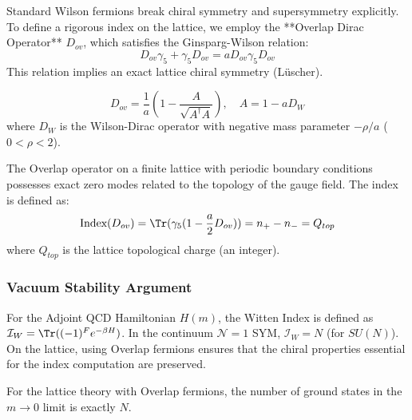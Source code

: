 Standard Wilson fermions break chiral symmetry and supersymmetry explicitly. To define a rigorous index on the lattice, we employ the **Overlap Dirac Operator** $D_{ov}$, which satisfies the Ginsparg-Wilson relation:
\begin{equation}
D_{ov} \gamma_5 + \gamma_5 D_{ov} = a D_{ov} \gamma_5 D_{ov}
\end{equation}
This relation implies an exact lattice chiral symmetry (Lüscher).

\begin{definition}
\begin{equation}
D_{ov} = \frac{1}{a} \left( 1 - \frac{A}{\sqrt{A^\dagger A}} \right), \quad A = 1 - a D_W
\end{equation}
where $D_W$ is the Wilson-Dirac operator with negative mass parameter $-\rho/a$ ($0 < \rho < 2$).
\end{definition}

\begin{theorem}
The Overlap operator on a finite lattice with periodic boundary conditions possesses exact zero modes related to the topology of the gauge field. The index is defined as:
\begin{equation}
\text{Index}(D_{ov}) = \Tr(\gamma_5 (1 - \frac{a}{2} D_{ov})) = n_+ - n_- = Q_{top}
\end{equation}
where $Q_{top}$ is the lattice topological charge (an integer).
\end{theorem}

\subsubsection{Vacuum Stability Argument}

For the Adjoint QCD Hamiltonian $H(m)$, the Witten Index is defined as $\mathcal{I}_W = \Tr((-1)^F e^{-\beta H})$.
In the continuum $\mathcal{N}=1$ SYM, $\mathcal{I}_W = N$ (for $SU(N)$).
On the lattice, using Overlap fermions ensures that the chiral properties essential for the index computation are preserved.

\begin{lemma}
For the lattice theory with Overlap fermions, the number of ground states in the $m \to 0$ limit is exactly $N$.
\end{lemma}

